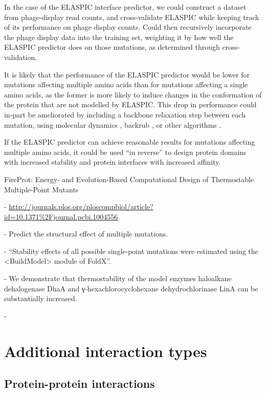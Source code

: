 In the case of the ELASPIC interface predictor, we could construct a dataset from phage-display read counts, and cross-validate ELASPIC while keeping track of its performance on phage display counts. Could then recursively incorporate the phage display data into the training set, weighting it by how well the ELASPIC predictor does on those mutations, as determined through cross-validation.

It is likely that the performance of the ELASPIC predictor would be lower for mutations affecting multiple amino acids than for mutations affecting a single amino acids, as the former is more likely to induce changes in the conformation of the protein that are not modelled by ELASPIC. This drop in performance could in-part be ameliorated by including a backbone relaxation step between each mutation, using molecular dynamics \cite{abraham_gromacs:_2015}, backrub \cite{smith_predicting_2011}, or other algorithms \cite{sun_protein_2016}.

If the ELASPIC predictor can achieve reasonable results for mutations affecting multiple amino acids, it could be used ``in reverse'' to design protein domains with increased stability and protein interfaces with increased affinity.

FireProt: Energy- and Evolution-Based Computational Design of Thermostable Multiple-Point Mutants

  - \url{http://journals.plos.org/ploscompbiol/article?id=10.1371%2Fjournal.pcbi.1004556}

  - Predict the structural effect of multiple mutations.

  - ``Stability effects of all possible single-point mutations were estimated using the <BuildModel> module of FoldX''.

  - We demonstrate that thermostability of the model enzymes haloalkane dehalogenase DhaA and γ-hexachlorocyclohexane dehydrochlorinase LinA can be substantially increased.

  - \cite{bednar_fireprot:_2015}



\section{Additional interaction types}

\subsection{Protein-protein interactions}

